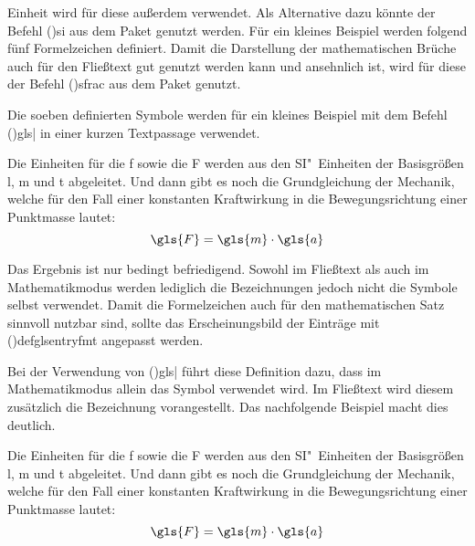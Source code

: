 \documentclass[%
  english,ngerman,%
  cdgeometry=no,DIV=12,%
  cd=false,cdfont=false,cdtitle=true,%
  headings=normal,%
  automark,%
  listof=toc,%
]{tudscrartcl}
\begin{document}
Einheit wird für diese außerdem  verwendet. Als Alternative dazu 
könnte der Befehl \Macro(){si} aus dem Paket  
genutzt werden. Für ein kleines Beispiel werden folgend fünf Formelzeichen 
definiert. Damit die Darstellung der mathematischen Brüche auch für den 
Fließtext gut genutzt werden kann und ansehnlich ist, wird für diese der Befehl 
\Macro(){sfrac} aus dem Paket  genutzt.
%
\CodeHook{\renewcommand*\newglossaryentry[2]{}}
\begin{Trunk*}

\end{Trunk*}
%
Die soeben definierten Symbole werden für ein kleines Beispiel mit dem Befehl 
\Macro(){gls|} in einer kurzen 
Textpassage verwendet.
%
\begin{Hint*}
Die Einheiten für die \gls{f} sowie die \gls{F} werden aus den 
SI"~Einheiten der Basisgrößen \gls{l}, \gls{m} und \gls{t} abgeleitet.
Und dann gibt es noch die Grundgleichung der Mechanik, welche für den
Fall einer konstanten Kraftwirkung in die Bewegungsrichtung einer
Punktmasse lautet:
\[\gls{F} = \gls{m} \cdot \gls{a}\]
\end{Hint*}
%
Das Ergebnis ist nur bedingt befriedigend. Sowohl im Fließtext als auch im 
Mathematikmodus werden lediglich die Bezeichnungen jedoch nicht die Symbole 
selbst verwendet. Damit die Formelzeichen auch für den mathematischen Satz 
sinnvoll nutzbar sind, sollte das Erscheinungsbild der Einträge mit 
\Macro(){defglsentryfmt} angepasst werden.
%
\begin{Preamble*}
\end{Preamble*}
%
Bei der Verwendung von \Macro(){gls|} 
führt diese Definition dazu, dass im Mathematikmodus allein das Symbol 
verwendet wird. Im Fließtext wird diesem zusätzlich die Bezeichnung 
vorangestellt. Das nachfolgende Beispiel macht dies deutlich.
%
\begin{Trunk*}
Die Einheiten für die \gls{f} sowie die \gls{F} werden aus den
SI"~Einheiten der Basisgrößen \gls{l}, \gls{m} und \gls{t} abgeleitet.
Und dann gibt es noch die Grundgleichung der Mechanik, welche für den
Fall einer konstanten Kraftwirkung in die Bewegungsrichtung einer
Punktmasse lautet:
\[\gls{F} = \gls{m} \cdot \gls{a}\]

\end{Trunk*}
\end{document}
